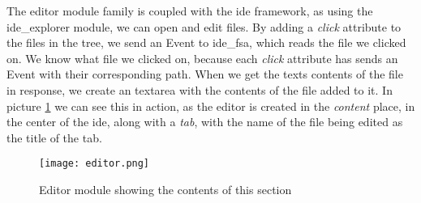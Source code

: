 The editor module family is coupled with the \gls{ide} framework, as using the
ide\_explorer module, we can open and edit files. By adding a \textit{click}
attribute to the files in the tree, we send an Event to \gls{ide}\_fsa, which
reads the file we clicked on. We know what file we clicked on, because each
\textit{click} attribute has sends an Event with their corresponding path. When
we get the texts contents of the file in response, we create an textarea with
the contents of the file added to it. In picture \ref{pic:editorModule} we can
see this in action, as the editor is created in the \textit{content} place, in
the center of the \gls{ide}, along with a \textit{tab}, with the name of the
file being edited as the title of the tab.

\begin{figure}
  \centering
  \texttt{[image: editor.png]}
  \caption{
    Editor module showing the contents of this section
  }
  \label{pic:editorModule}
\end{figure}

